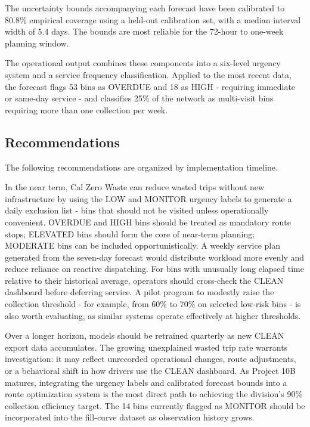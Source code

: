 \documentclass[11pt]{article}
\begin{document}
The uncertainty bounds accompanying each forecast have been calibrated to 80.8\%
empirical coverage using a held-out calibration set, with a median interval width of
5.4 days. The bounds are most reliable for the 72-hour to one-week planning window.

The operational output combines these components into a six-level urgency system and a
service frequency classification. Applied to the most recent data, the forecast flags
53 bins as OVERDUE and 18 as HIGH - requiring immediate or same-day service - and
classifies 25\% of the network as multi-visit bins requiring more than one collection
per week.

\subsection{Recommendations}

The following recommendations are organized by implementation timeline.

In the near term, Cal Zero Waste can reduce wasted trips without new infrastructure by
using the LOW and MONITOR urgency labels to generate a daily exclusion list - bins that
should not be visited unless operationally convenient. OVERDUE and HIGH bins should be
treated as mandatory route stops; ELEVATED bins should form the core of near-term
planning; MODERATE bins can be included opportunistically. A weekly service plan
generated from the seven-day forecast would distribute workload more evenly and reduce
reliance on reactive dispatching. For bins with unusually long elapsed time relative to
their historical average, operators should cross-check the CLEAN dashboard before
deferring service. A pilot program to modestly raise the collection threshold - for
example, from 60\% to 70\% on selected low-risk bins - is also worth evaluating, as
similar systems operate effectively at higher thresholds.

Over a longer horizon, models should be retrained quarterly as new CLEAN export data
accumulates. The growing unexplained wasted trip rate warrants investigation: it may
reflect unrecorded operational changes, route adjustments, or a behavioral shift in how
drivers use the CLEAN dashboard. As Project 10B matures, integrating the urgency labels
and calibrated forecast bounds into a route optimization system is the most direct path
to achieving the division's 90\% collection efficiency target. The 14 bins currently
flagged as MONITOR should be incorporated into the fill-curve dataset as observation
history grows.
\end{document}
